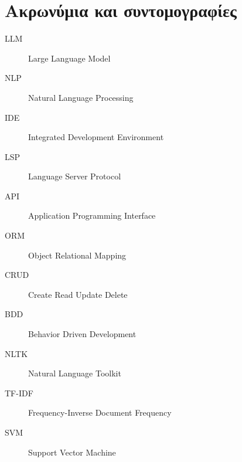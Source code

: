 \chapter{Ακρωνύμια και συντομογραφίες}

\begin{description}
\item[LLM]
  Large Language Model
\item[NLP]
  Natural Language Processing
\item[IDE]
  Integrated Development Environment
\item[LSP]
  Language Server Protocol
\item[API]
  Application Programming Interface
\item[ORM]
  Object Relational Mapping
\item[CRUD]
  Create Read Update Delete
\item[BDD]
  Behavior Driven Development
\item[NLTK]
  Natural Language Toolkit
\item[TF-IDF]
  Frequency-Inverse Document Frequency
\item[SVM]
  Support Vector Machine
\end{description}
